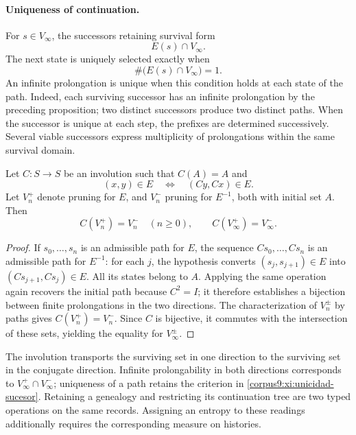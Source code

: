 \paragraph{Uniqueness of continuation.}
For \(s\in V_\infty\), the successors retaining survival form
\[
 E(s)\cap V_\infty.
\]
The next state is uniquely selected exactly when
\begin{equation}
 \#\bigl(E(s)\cap V_\infty\bigr)=1.
 \label{corpus9:xi:unicidad-sucesor}
\end{equation}
An infinite prolongation is unique when this condition holds at
each state of the path. Indeed, each surviving successor has an
infinite prolongation by the preceding proposition; two distinct
successors produce two distinct paths. When the successor is unique
at each step, the prefixes are determined successively.
Several viable successors express multiplicity of prolongations
within the same survival domain.

\begin{proposition}
\label{corpus9:xi:conjugacion-supervivencia}
Let \(C:S\to S\) be an involution such that \(C(A)=A\) and
\begin{equation}
 (x,y)\in E\quad\Longleftrightarrow\quad(Cy,Cx)\in E.
 \label{corpus9:xi:involucion-prolongaciones}
\end{equation}
Let \(V_n^+\) denote pruning for \(E\), and \(V_n^-\) pruning for
\(E^{-1}\), both with initial set \(A\). Then
\[
 C(V_n^+)=V_n^-\quad(n\geq0),\qquad
 C(V_\infty^+)=V_\infty^-.
\]
\end{proposition}

\begin{proof}
If \(s_0,\ldots,s_n\) is an admissible path for \(E\), the sequence
\(Cs_0,\ldots,Cs_n\) is an admissible path for \(E^{-1}\):
for each \(j\), the hypothesis converts
\((s_j,s_{j+1})\in E\) into \((Cs_{j+1},Cs_j)\in E\).
All its states belong to \(A\). Applying the same operation again
recovers the initial path because \(C^2=I\); it therefore establishes
a bijection between finite prolongations in the two directions.
The characterization of \(V_n^\pm\) by paths gives
\(C(V_n^+)=V_n^-\). Since \(C\) is bijective, it commutes with the
intersection of these sets, yielding the equality for
\(V_\infty^\pm\).
\end{proof}

The involution transports the surviving set in one direction to
the surviving set in the conjugate direction. Infinite
prolongability in both directions corresponds to
\(V_\infty^+\cap V_\infty^-\); uniqueness of a path retains the
criterion in \eqref{corpus9:xi:unicidad-sucesor}. Retaining a
genealogy and restricting its continuation tree are two typed
operations on the same records. Assigning an entropy to these
readings additionally requires the corresponding measure on histories.
